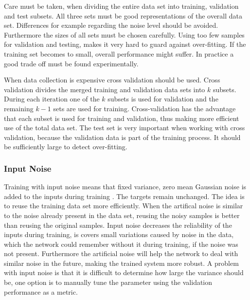 Care must be taken, when dividing the entire data set into training, validation and test subsets. All three sets must be good representations of the overall data set. Differences for example regarding the noise level should be avoided. Furthermore the sizes of all sets must be chosen carefully. Using too few samples for validation and testing, makes it very hard to guard against over-fitting. If the training set becomes to small, overall performance might suffer. In practice a good trade off must be found experimentally.

When data collection is expensive cross validation should be used. Cross validation divides the merged training and validation data sets into $k$ subsets. During each iteration one of the $k$ subsets is used for validation and the remaining $k-1$ sets are used for training. Cross-validation has the advantage that each subset is used for training and validation, thus making more efficient use of the total data set. The test set is very important when working with cross validation, because the validation data is part of the training process. It should be sufficiently large to detect over-fitting.
  

\subsubsection{Input Noise}
Training with input noise means that fixed variance, zero mean Gaussian noise is added to the inputs during training \cite[page 32]{Graves2012}. The targets remain unchanged. The idea is to reuse the training data set more efficiently. When the artifical noise is similar to the noise already present in the data set, reusing the noisy samples is better than reusing the original samples. Input noise decreases the reliability of the inputs during training, is covers small variations caused by noise in the data, which the network could remember without it during training, if the noise was not present. Furthermore the artificial noise will help the network to deal with similar noise in the future, making the trained system more robust. 
A problem with input noise is that it is difficult to determine how large the variance should be, one option is to manually tune the parameter using the validation performance as a metric.

